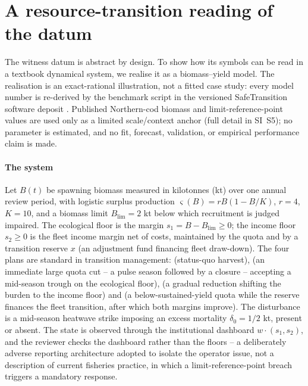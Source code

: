 \section{A resource-transition reading of the datum}\label{sec:benchmark}

The witness datum is abstract by design. To show how its symbols can be read in a textbook dynamical system, we realise it as a \citet{Schaefer1954} biomass--yield model. The realisation is an exact-rational illustration, not a fitted case study: every model number is re-derived by the benchmark script in the versioned SafeTransition software deposit \citep{Abaee2026software}. Published Northern-cod biomass and limit-reference-point values are used only as a limited scale/context anchor (full detail in SI~S5); no parameter is estimated, and no fit, forecast, validation, or empirical performance claim is made.

\paragraph{The system} Let $B(t)$ be spawning biomass measured in kilotonnes (kt) over one annual review period, with logistic surplus production $\varsigma(B)=rB(1-B/K)$, $r=4$, $K=10$, and a biomass limit $B_{\mathrm{lim}}=2$ kt below which recruitment is judged impaired. The ecological floor is the margin $s_1=B-B_{\mathrm{lim}}\ge0$; the income floor $s_2\ge0$ is the fleet income margin net of costs, maintained by the quota and by a transition reserve $x$ (an adjustment fund financing fleet draw-down). The four plans are standard in transition management:  (status-quo harvest),  (an immediate large quota cut -- a pulse season followed by a closure -- accepting a mid-season trough on the ecological floor),  (a gradual reduction shifting the burden to the income floor) and  (a below-sustained-yield quota while the reserve finances the fleet transition, after which both margins improve). The disturbance is a mid-season heatwave strike imposing an excess mortality $\delta_0=1/2$ kt, present or absent. The state is observed through the institutional dashboard $w\cdot(s_1,s_2)$, and the reviewer checks the dashboard rather than the floors -- a deliberately adverse reporting architecture adopted to isolate the operator issue, not a description of current fisheries practice, in which a limit-reference-point breach triggers a mandatory response.

